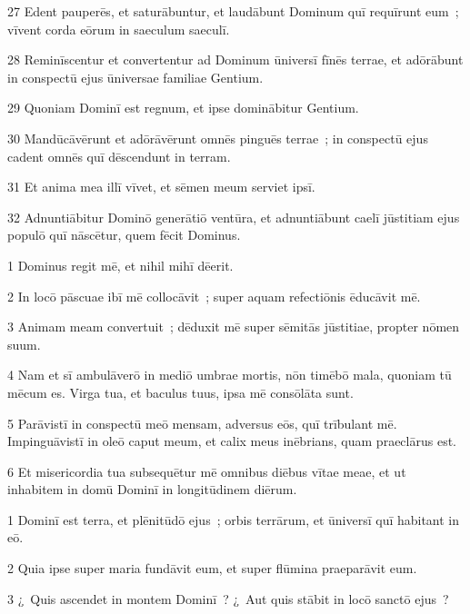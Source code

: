 \psalmVerse
  {\phantom{0}27}
  {Edent pauperēs, et saturābuntur, et laudābunt Dominum quī requīrunt eum~; vīvent corda eōrum in saeculum saeculī.}


\psalmVerse
  {\phantom{0}28}
  {Reminīscentur et convertentur ad Dominum ūniversī fīnēs terrae, et adōrābunt in conspectū ejus ūniversae familiae Gentium.}


\psalmVerse
  {\phantom{0}29}
  {Quoniam Dominī est regnum, et ipse dominābitur Gentium.}


\psalmVerse
  {\phantom{0}30}
  {Mandūcāvērunt et adōrāvērunt omnēs pinguēs terrae~; in conspectū ejus cadent omnēs quī dēscendunt in terram.}


\psalmVerse
  {\phantom{0}31}
  {Et anima mea illī vīvet, et sēmen meum serviet ipsī.}


\psalmVerse
  {\phantom{0}32}
  {Adnuntiābitur Dominō generātiō ventūra, et adnuntiābunt caelī jūstitiam ejus populō quī nāscētur, quem fēcit Dominus.}



\psalmVerse
  {\phantom{00}1}
  {Dominus regit mē, et nihil mihī dēerit.}


\psalmVerse
  {\phantom{00}2}
  {In locō pāscuae ibī mē collocāvit~; super aquam refectiōnis ēducāvit mē.}


\psalmVerse
  {\phantom{00}3}
  {Animam meam convertuit~; dēduxit mē super sēmitās jūstitiae, propter nōmen suum.}


\psalmVerse
  {\phantom{00}4}
  {Nam et sī ambulāverō in mediō umbrae mortis, nōn timēbō mala, quoniam tū mēcum es. Virga tua, et baculus tuus, ipsa mē consōlāta sunt.}


\psalmVerse
  {\phantom{00}5}
  {Parāvistī in conspectū meō mensam, adversus eōs, quī trībulant mē. Impinguāvistī in oleō caput meum, et calix meus inēbrians, quam praeclārus est.}


\psalmVerse
  {\phantom{00}6}
  {Et misericordia tua subsequētur mē omnibus diēbus vītae meae, et ut inhabitem in domū Dominī in longitūdinem diērum.}



\psalmVerse
  {\phantom{00}1}
  {Dominī est terra, et plēnitūdō ejus~; orbis terrārum, et ūniversī quī habitant in eō.}


\psalmVerse
  {\phantom{00}2}
  {Quia ipse super maria fundāvit eum, et super flūmina praeparāvit eum.}


\psalmVerse
  {\phantom{00}3}
  {¿~Quis ascendet in montem Dominī~? ¿~Aut quis stābit in locō sanctō ejus~?}


